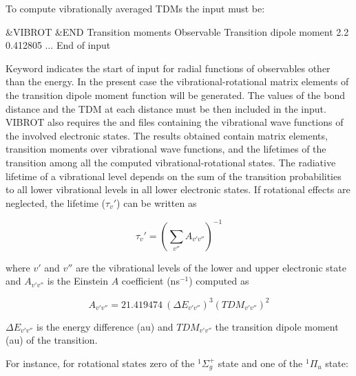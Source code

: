
To compute vibrationally averaged TDMs the  input must be:

\begin{inputlisting}
 &VIBROT &END
Transition moments
Observable
Transition dipole moment
2.2 0.412805
...
End of input
\end{inputlisting}

Keyword  indicates the start of input
for radial functions of observables other than the energy.
In the present case the vibrational-rotational matrix elements
of the transition dipole moment function will be generated.
The values of the bond distance and the TDM at each distance
must be then included in the input. VIBROT also requires
the  and  files 
containing the vibrational wave functions of the involved electronic states. 
The results obtained contain matrix elements, transition
moments over vibrational wave functions, and the lifetimes of the
transition among all the computed vibrational-rotational states.
The radiative lifetime of a vibrational level depends on the
sum of the transition probabilities to all lower vibrational
levels in all lower electronic states. If rotational effects are
neglected, the lifetime ($\tau_v'$) can be written as

\begin{equation}
\tau_v' = ( \sum_{v''} A_{v'v''} )^{-1}
\end{equation}

where $v'$ and $v''$ are the vibrational 
levels of the lower and upper electronic state and $A_{v'v''}$ is the
Einstein $A$ coefficient (ns$^{-1}$) computed as

\begin{equation}
A_{v'v''} = 21.419474~ (\Delta E_{v'v''})^3 (TDM_{v'v''})^2
\end{equation}

$\Delta E_{v'v''}$ is the energy difference (au) and $TDM_{v'v''}$
the transition dipole moment (au) of the transition.  
 
For instance, for rotational states zero of the $^1\Sigma^+_g$ state
and one of the $^1\Pi_u$ state:

